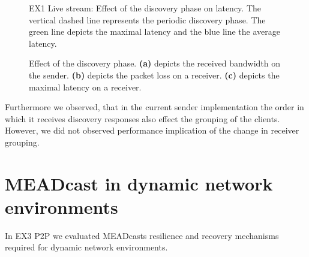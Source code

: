 \begin{figure}
    \begin{center}
        
    \end{center}
    \caption[Effect of the discovery phase on latency]{
        EX1 Live stream: Effect of the discovery phase on latency.
        The vertical dashed line represents the periodic discovery phase.
        The green line depicts the maximal latency and the blue line the
        average latency.
    }
    \label{fig:dcvr_latency_effect}
\end{figure}

\begin{figure}
    \begin{center}
        
    \end{center}
    \caption[Effect of the discovery phase]{
        Effect of the discovery phase.
        \textbf{(a)} depicts the received bandwidth on the sender.
        \textbf{(b)} depicts the packet loss on a receiver.
        \textbf{(c)} depicts the maximal latency on a receiver.
    }
    \label{fig:dcvr_loss_effect}
\end{figure}

Furthermore we observed, that in the current sender implementation the order in
    which it receives discovery responses also effect the grouping of the
    clients.
However, we did not observed performance implication of the change in receiver
    grouping.

\section{MEADcast in dynamic network environments} %
\label{sec:MEADcast in dynamic network environments}

In EX3 P2P we evaluated MEADcasts resilience and recovery mechanisms required
    for dynamic network environments.

